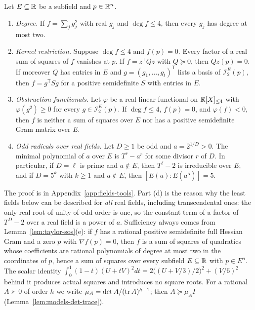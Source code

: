 \begin{lemma}
\label{lem:fields-tools}
Let $E\subseteq\mathbb R$ be a subfield and $p\in\mathbb R^n$.
\begin{enumerate}[label=(\alph*)]
\item \emph{Degree.} If $f=\sum_jg_j^2$ with real $g_j$ and $\deg f\le4$,
  then every $g_j$ has degree at most two.
\item \emph{Kernel restriction.} Suppose $\deg f\le4$ and $f(p)=0$. Every
  factor of a real sum of squares of $f$ vanishes at $p$. If
  $f=z^{\mathsf T}Qz$ with $Q\succeq0$, then $Qz(p)=0$. If moreover $Q$ has
  entries in $E$ and $g=(g_1,\ldots,g_t)^{\mathsf T}$ lists a basis of
  $\mathcal I_2^E(p)$, then $f=g^{\mathsf T}Sg$ for a positive semidefinite $S$
  with entries in $E$.
\item \emph{Obstruction functionals.} Let $\varphi$ be a real linear
  functional on $\mathbb R[X]_{\le4}$ with $\varphi(g^2)\ge0$ for every
  $g\in\mathcal I_2^E(p)$. If $\deg f\le 4$, $f(p)=0$, and $\varphi(f)<0$,
  then $f$ is neither a sum of squares over $E$ nor has a positive
  semidefinite Gram matrix over $E$.
\item \emph{Odd radicals over real fields.} Let $D\ge1$ be odd and
  $a=2^{1/D}>0$. The minimal polynomial of $a$ over $E$ is $T^r-a^r$ for some
  divisor $r$ of $D$. In particular, if $D=\ell$ is prime and $a\notin E$,
  then $T^\ell-2$ is irreducible over $E$; and if $D=5^k$ with $k\ge1$ and
  $a\notin E$, then $[E(a):E(a^5)]=5$.
\end{enumerate}
\end{lemma}

The proof is in Appendix~\ref{app:fields-tools}. Part (d) is the reason why
the least fields below can be described for \emph{all} real fields, including
transcendental ones: the only real root of unity of odd order is one, so the
constant term of a factor of $T^D-2$ over a real field is a power of $a$.
Sufficiency always comes from Lemma~\ref{lem:taylor-sos}(e): if $f$ has a
rational positive semidefinite full Hessian Gram and a zero $p$ with
$\nabla f(p)=0$, then $f$ is a sum of squares of quadratics whose
coefficients are rational polynomials of degree at most two in the
coordinates of $p$, hence a sum of squares over every subfield $E\subseteq\mathbb R$
with $p\in E^n$. The scalar identity
$\int_0^1(1-t)(U+tV)^2dt=2\bigl((U+V/3)/2\bigr)^2+(V/6)^2$ behind it produces
actual squares and introduces no square roots. For a rational $A\succ0$ of
order $h$ we write $\mu_A=\det A/(\operatorname{tr} A)^{h-1}$; then $A\succeq\mu_AI$
(Lemma~\ref{lem:models-det-trace}).


